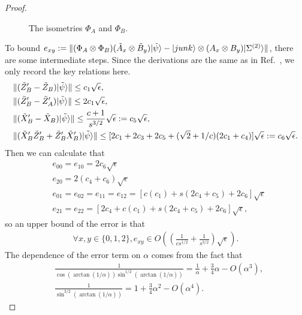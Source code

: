 \documentclass[11pt,letterpaper]{article}
\newcommand{\ket}[1]{|#1\rangle}
\newcommand{\x}{\otimes}
\DeclarePairedDelimiter{\norm}{\lVert}{\rVert}
\newcommand{\1}{\mathbb{1}}
\newcommand{\EPR}[1]{\Sigma^{(#1)}}
\newcommand{\tA}{\tilde{A}}
\newcommand{\tB}{\tilde{B}}
\newcommand{\tX}{\tilde{X}}
\newcommand{\tZ}{\tilde{Z}}
\newcommand{\tpsi}{\tilde{\psi}}
\theoremstyle{definition}
\begin{document}
\begin{proof}
\begin{figure}[H]
	\caption{The isometries $\Phi_A$ and $\Phi_B$.}
\end{figure}
To bound $e_{xy} := \norm{ (\Phi_A\x\Phi_B) (\tA_x \x \tB_y) \ket{\tpsi} - \ket{junk} \x (A_x\x B_y) \ket{\EPR{2}}}$,
there are some intermediate steps. Since the derivations are the same as in Ref.~\cite{bamps2015}, 
we only record the key relations here.
\begin{align}
	&\norm{(\tZ_B' - \tZ_B) \ket{\tpsi}} \leq c_1 \sqrt{\epsilon},\\
	&\norm{(\tZ_B' - \tZ_A') \ket{\tpsi}} \leq 2c_1 \sqrt{\epsilon}, \\
	&\norm{(\tX_B' - \tX_B) \ket{\tpsi}} \leq \frac{c+1}{s^{3/2}} \sqrt{\epsilon} := c_5\sqrt{\epsilon},\\
	&\norm{(\tX_B'\tZ_B'+ \tZ_B'\tX_B')\ket{\tpsi}} \leq [2c_1 + 2c_3 + 2c_5 + (\sqrt{2}+1/c)(2c_1+c_4)]\sqrt{\epsilon}
	:= c_6 \sqrt{\epsilon}.
\end{align}
Then we can calculate that 
\begin{align}
	&e_{00} = e_{10} = 2c_6 \sqrt{\epsilon}\\
	&e_{20} = 2(c_4 + c_6) \sqrt{\epsilon}\\
	&e_{01} = e_{02} = e_{11} = e_{12} = [c(c_1)+s(2c_4 + c_5) + 2c_6]\sqrt{\epsilon}\\
	&e_{21} = e_{22} = [2c_4 + c(c_1)+s(2c_4 + c_5) + 2c_6]\sqrt{\epsilon},
\end{align}
so an upper bound of the error is that
\begin{align}
	\forall x,y \in \{0,1,2\}, e_{xy} \in O((\frac{1}{cs^{1/2}} + \frac{1}{s^{3/2}})\sqrt{\epsilon}).
\end{align}
The dependence of the error term on $\alpha$ comes from the fact that 
\begin{align}
&\frac{1}{\cos(\arctan(1/\alpha)) \sin^{1/2}(\arctan(1/\alpha))} = \frac{1}{\alpha}+\frac{3}{4}\alpha - O(\alpha^3),\\
&\frac{1}{\sin^{3/2}(\arctan(1/\alpha))} = 1 + \frac{3}{4}\alpha^2 - O(\alpha^4).
\end{align}
\end{proof}
\end{document}
